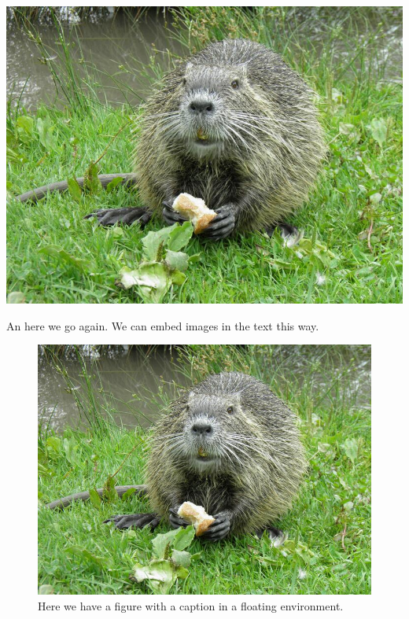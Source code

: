\documentclass[10pt,a4paper,twoside]{article}
\begin{document}
\begin{center}
  \includegraphics[width = .8\textwidth]{figures/ragondin_small.jpg}
\end{center}

\noindent An here we go again.
We can embed images in the text this way.

\begin{figure}
  \begin{center}
    \includegraphics[width = .8\textwidth]{figures/ragondin_small.jpg}
    \caption{Here we have a figure with a caption in a floating environment.
      \blindtext[1]}
  \end{center}
\end{figure}



\blindtext[4]
\end{document}
